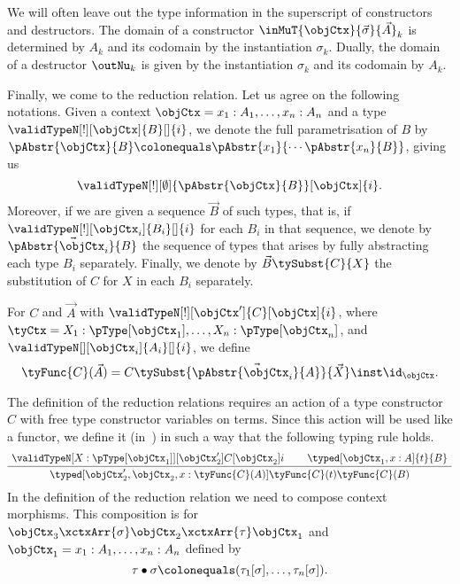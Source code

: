 \documentclass[preprint]{sigplanconf}
\begin{document}
We will often leave out the type information in
the superscript of constructors and destructors.
The domain of a constructor
$\inMuT{\objCtx}{\vec{\sigma}}{\vec{A}}_k$
is determined by $A_k$ and its codomain by the instantiation $\sigma_k$.
Dually, the domain of a destructor $\outNu_k$ is given by the instantiation  $\sigma_k$
and its codomain by $A_k$.



Finally, we come to the reduction relation.
Let us agree on the following notations.
Given a context $\cramped{\objCtx = x_1 : A_1, \dotsc, x_n : A_n}$
and a type $\validTypeN[!][\objCtx]{B}[]{i}$, we denote the
full parametrisation of $B$
by $\pAbstr{\objCtx}{B} \colonequals \pAbstr{x_1}{\dotsm \pAbstr{x_n}{B}}$,
giving us
\begin{equation*}
  \validTypeN[!][\emptyset]{\pAbstr{\objCtx}{B}}[\objCtx]{i}.
\end{equation*}
Moreover, if we are given a sequence $\vec{B}$ of such types, that is,
if $\validTypeN[!][\objCtx_i]{B_i}[]{i}$ for each $B_i$ in that sequence,
we denote by $\vec{\pAbstr{\objCtx_i}{B}}$ the sequence of types that arises
by fully abstracting each type $B_i$ separately.
Finally, we denote by $\vec{B} \tySubst{C}{X}$ the
substitution of $C$ for $X$ in each $B_i$ separately.

For $C$ and $\vec{A}$ with $\validTypeN[!][\objCtx']{C}[\objCtx]{i}$,
where $\tyCtx = X_1 : \pType[\objCtx_1], \dotsc, X_n : \pType[\objCtx_n]$, and
$\validTypeN[][\objCtx_i]{A_i}[]{i}$, we define
\begin{equation*}
  \tyFunc{C}(\vec{A}) =
  C \tySubst{\vec{\pAbstr{\objCtx_i}{A}}}{\vec{X}} \inst \id_{\objCtx}.
\end{equation*}

The definition of the reduction relations requires an action of a type constructor $C$ with free
type constructor variables on terms.
Since this action will be used like a functor, we define it
(in~) in such a way that the following typing rule holds.
\begin{equation}
  \label{eq:typing-functor-from-type}
  \AxiomC{$
    \validTypeN[X: {\pType[\objCtx_1]}][\objCtx_2']{C}[\objCtx_2]{i}$}
\AxiomC{$\typed[\objCtx_1, x : A]{t}{B}$}
  \BinaryInfC{$
    \typed[\objCtx_2', \objCtx_2, x : \tyFunc{C}(A)]
    {\tyFunc{C}(t)}{\tyFunc{C}(B)}$}
  \DisplayProof
\end{equation}
In the definition of the reduction relation we need to compose
context morphisms.
This composition is for
$\objCtx_3 \xctxArr{\sigma} \objCtx_2 \xctxArr{\tau} \objCtx_1$
and $\objCtx_1 = x_1 : A_1, \dotsc, x_n:A_n$ defined by
\begin{equation}
  \label{eq:compose-ctx-mor}
  \tau \bullet \sigma \colonequals (\tau_1[\sigma], \dotsc, \tau_n[\sigma]).
\end{equation}
\end{document}
